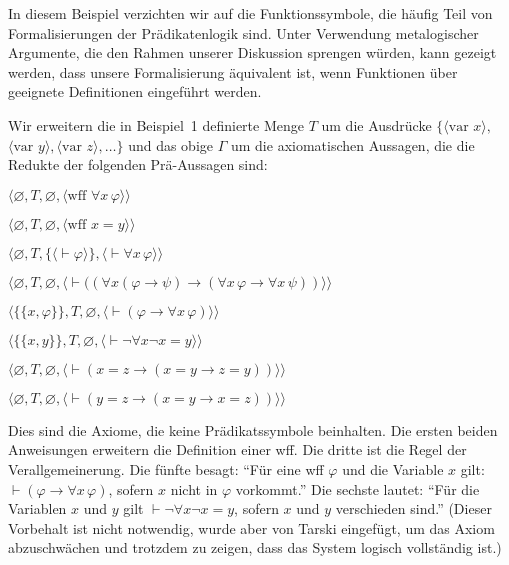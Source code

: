 In diesem Beispiel verzichten wir auf die Funktionssymbole, die häufig Teil von Formalisierungen der Prädikatenlogik sind.  Unter Verwendung metalogischer Argumente, die den Rahmen unserer Diskussion sprengen würden, kann gezeigt werden, dass unsere Formalisierung äquivalent ist, wenn Funktionen über geeignete Definitionen eingeführt werden.

Wir erweitern die in Beispiel~1 definierte Menge $T$ um die Ausdrücke $\{\langle \mbox{var\ } x\rangle,$ $ \langle \mbox{var\ } y\rangle, \langle \mbox{var\ } z\rangle,\ldots\}$ und das obige $\Gamma$ um die axiomatischen Aussagen, die die Redukte der folgenden Prä-Aussagen sind:
\begin{list}{}{\itemsep 0.0pt}
      \item[] $\langle\varnothing,T,\varnothing,
               \langle \mbox{wff\ }\forall x\,\varphi\rangle\rangle$
      \item[] $\langle\varnothing,T,\varnothing,
               \langle \mbox{wff\ }x=y\rangle\rangle$
      \item[] $\langle\varnothing,T,
               \{\langle\vdash\varphi\rangle\},
               \langle\vdash\forall x\,\varphi\rangle\rangle$
      \item[] $\langle\varnothing,T,\varnothing,
               \langle \vdash((\forall x(\varphi\to\psi)
                  \to(\forall x\,\varphi\to\forall x\,\psi))
               \rangle\rangle$
      \item[] $\langle\{\{x,\varphi\}\},T,\varnothing,
               \langle \vdash(\varphi\to\forall x\,\varphi)
               \rangle\rangle$
      \item[] $\langle\{\{x,y\}\},T,\varnothing,
               \langle \vdash\lnot\forall x\lnot x=y
               \rangle\rangle$
      \item[] $\langle\varnothing,T,\varnothing,
               \langle \vdash(x=z
                  \to(x=y\to z=y))
               \rangle\rangle$
      \item[] $\langle\varnothing,T,\varnothing,
               \langle \vdash(y=z
                  \to(x=y\to x=z))
               \rangle\rangle$
\end{list}
Dies sind die Axiome, die keine Prädikatssymbole beinhalten. Die ersten beiden Anweisungen erweitern die Definition einer wff.  Die dritte ist die Regel der Verallgemeinerung.  Die fünfte besagt: "`Für eine wff $\varphi$ und die Variable $x$ gilt: $\vdash(\varphi\to\forall x\,\varphi)$, sofern $x$ nicht in $\varphi$ vorkommt."'  Die sechste lautet: "`Für die Variablen $x$ und $y$ gilt $\vdash\lnot\forall x\lnot x = y$, sofern $x$ und $y$ verschieden sind."' (Dieser Vorbehalt ist nicht notwendig, wurde aber von Tarski eingefügt, um das Axiom abzuschwächen und trotzdem zu zeigen, dass das System logisch vollständig ist.)

